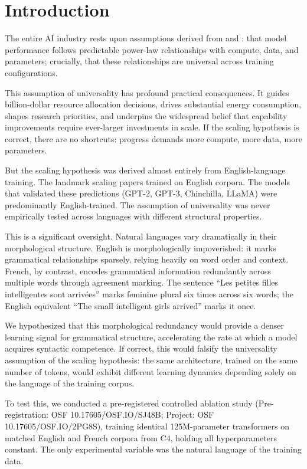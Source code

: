 \documentclass[11pt,a4paper]{article}
\begin{document}
\section{Introduction}

The entire AI industry rests upon assumptions derived from \citet{kaplan2020scaling} and \citet{hoffmann2022training}: that model performance follows predictable power-law relationships with compute, data, and parameters; crucially, that these relationships are universal across training configurations.

This assumption of universality has profound practical consequences. It guides billion-dollar resource allocation decisions, drives substantial energy consumption, shapes research priorities, and underpins the widespread belief that capability improvements require ever-larger investments in scale. If the scaling hypothesis is correct, there are no shortcuts: progress demands more compute, more data, more parameters.

But the scaling hypothesis was derived almost entirely from English-language training. The landmark scaling papers \citep{kaplan2020scaling,hoffmann2022training} trained on English corpora. The models that validated these predictions (GPT-2, GPT-3, Chinchilla, LLaMA) were predominantly English-trained. The assumption of universality was never empirically tested across languages with different structural properties.

This is a significant oversight. Natural languages vary dramatically in their morphological structure. English is morphologically impoverished: it marks grammatical relationships sparsely, relying heavily on word order and context. French, by contrast, encodes grammatical information redundantly across multiple words through agreement marking. The sentence ``Les petites filles intelligentes sont arriv\'{e}es'' marks feminine plural six times across six words; the English equivalent ``The small intelligent girls arrived'' marks it once.

We hypothesized that this morphological redundancy would provide a denser learning signal for grammatical structure, accelerating the rate at which a model acquires syntactic competence. If correct, this would falsify the universality assumption of the scaling hypothesis: the same architecture, trained on the same number of tokens, would exhibit different learning dynamics depending solely on the language of the training corpus.

To test this, we conducted a pre-registered controlled ablation study (Pre-registration: OSF 10.17605/OSF.IO/SJ48B; Project: OSF 10.17605/OSF.IO/2PG8S), training identical 125M-parameter transformers on matched English and French corpora from C4, holding all hyperparameters constant. The only experimental variable was the natural language of the training data.
\end{document}
